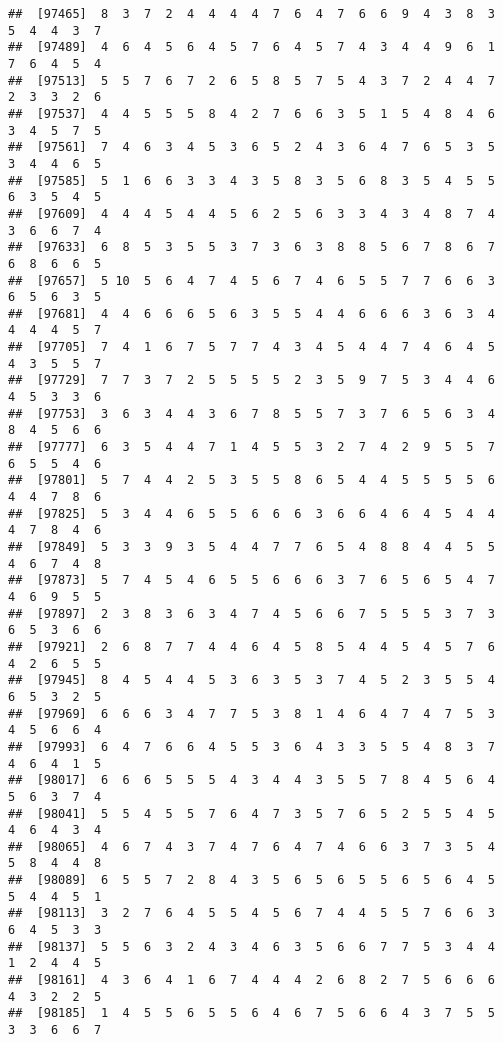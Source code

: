 \documentclass[
]{book}
\begin{document}
\begin{verbatim}
##  [97465]  8  3  7  2  4  4  4  4  7  6  4  7  6  6  9  4  3  8  3  5  4  4  3  7
##  [97489]  4  6  4  5  6  4  5  7  6  4  5  7  4  3  4  4  9  6  1  7  6  4  5  4
##  [97513]  5  5  7  6  7  2  6  5  8  5  7  5  4  3  7  2  4  4  7  2  3  3  2  6
##  [97537]  4  4  5  5  5  8  4  2  7  6  6  3  5  1  5  4  8  4  6  3  4  5  7  5
##  [97561]  7  4  6  3  4  5  3  6  5  2  4  3  6  4  7  6  5  3  5  3  4  4  6  5
##  [97585]  5  1  6  6  3  3  4  3  5  8  3  5  6  8  3  5  4  5  5  6  3  5  4  5
##  [97609]  4  4  4  5  4  4  5  6  2  5  6  3  3  4  3  4  8  7  4  3  6  6  7  4
##  [97633]  6  8  5  3  5  5  3  7  3  6  3  8  8  5  6  7  8  6  7  6  8  6  6  5
##  [97657]  5 10  5  6  4  7  4  5  6  7  4  6  5  5  7  7  6  6  3  6  5  6  3  5
##  [97681]  4  4  6  6  6  5  6  3  5  5  4  4  6  6  6  3  6  3  4  4  4  4  5  7
##  [97705]  7  4  1  6  7  5  7  7  4  3  4  5  4  4  7  4  6  4  5  4  3  5  5  7
##  [97729]  7  7  3  7  2  5  5  5  5  2  3  5  9  7  5  3  4  4  6  4  5  3  3  6
##  [97753]  3  6  3  4  4  3  6  7  8  5  5  7  3  7  6  5  6  3  4  8  4  5  6  6
##  [97777]  6  3  5  4  4  7  1  4  5  5  3  2  7  4  2  9  5  5  7  6  5  5  4  6
##  [97801]  5  7  4  4  2  5  3  5  5  8  6  5  4  4  5  5  5  5  6  4  4  7  8  6
##  [97825]  5  3  4  4  6  5  5  6  6  6  3  6  6  4  6  4  5  4  4  4  7  8  4  6
##  [97849]  5  3  3  9  3  5  4  4  7  7  6  5  4  8  8  4  4  5  5  4  6  7  4  8
##  [97873]  5  7  4  5  4  6  5  5  6  6  6  3  7  6  5  6  5  4  7  4  6  9  5  5
##  [97897]  2  3  8  3  6  3  4  7  4  5  6  6  7  5  5  5  3  7  3  6  5  3  6  6
##  [97921]  2  6  8  7  7  4  4  6  4  5  8  5  4  4  5  4  5  7  6  4  2  6  5  5
##  [97945]  8  4  5  4  4  5  3  6  3  5  3  7  4  5  2  3  5  5  4  6  5  3  2  5
##  [97969]  6  6  6  3  4  7  7  5  3  8  1  4  6  4  7  4  7  5  3  4  5  6  6  4
##  [97993]  6  4  7  6  6  4  5  5  3  6  4  3  3  5  5  4  8  3  7  4  6  4  1  5
##  [98017]  6  6  6  5  5  5  4  3  4  4  3  5  5  7  8  4  5  6  4  5  6  3  7  4
##  [98041]  5  5  4  5  5  7  6  4  7  3  5  7  6  5  2  5  5  4  5  4  6  4  3  4
##  [98065]  4  6  7  4  3  7  4  7  6  4  7  4  6  6  3  7  3  5  4  5  8  4  4  8
##  [98089]  6  5  5  7  2  8  4  3  5  6  5  6  5  5  6  5  6  4  5  5  4  4  5  1
##  [98113]  3  2  7  6  4  5  5  4  5  6  7  4  4  5  5  7  6  6  3  6  4  5  3  3
##  [98137]  5  5  6  3  2  4  3  4  6  3  5  6  6  7  7  5  3  4  4  1  2  4  4  5
##  [98161]  4  3  6  4  1  6  7  4  4  4  2  6  8  2  7  5  6  6  6  4  3  2  2  5
##  [98185]  1  4  5  5  6  5  5  6  4  6  7  5  6  6  4  3  7  5  5  3  3  6  6  7

\end{verbatim}
\end{document}

